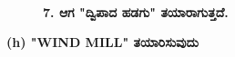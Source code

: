 \begin{figure}[H]
\\
\textbf{7. ಆಗ  "ದ್ವಿಪಾದ ಹಡಗು" ತಯಾರಾಗುತ್ತದೆ.}
\end{figure}


\noindent
\textbf{(h) "WIND MILL" ತಯಾರಿಸುವುದು}
\begin{figure}[H]
\end{figure}

